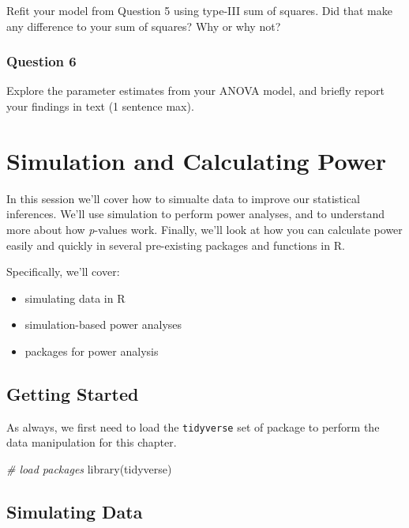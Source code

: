 \documentclass[
]{book}
\newenvironment{Shaded}{\begin{snugshade}}{\end{snugshade}}
\newcommand{\CommentTok}[1]{\textcolor[rgb]{0.56,0.35,0.01}{\textit{#1}}}
\newcommand{\FunctionTok}[1]{\textcolor[rgb]{0.00,0.00,0.00}{#1}}
\newcommand{\NormalTok}[1]{#1}
\providecommand{\tightlist}{%
  \setlength{\itemsep}{0pt}\setlength{\parskip}{0pt}}
\begin{document}
Refit your model from Question 5 using type-III sum of squares. Did that make any difference to your sum of squares? Why or why not?

\hypertarget{question-6-6}{%
\subsection{Question 6}\label{question-6-6}}

Explore the parameter estimates from your ANOVA model, and briefly report your findings in text (1 sentence max).

\hypertarget{simulation-and-calculating-power}{%
\chapter{Simulation and Calculating Power}\label{simulation-and-calculating-power}}

In this session we'll cover how to simualte data to improve our statistical inferences. We'll use simulation to perform power analyses, and to understand more about how \emph{p}-values work. Finally, we'll look at how you can calculate power easily and quickly in several pre-existing packages and functions in R.

Specifically, we'll cover:

\begin{itemize}
\tightlist
\item
  simulating data in R
\item
  simulation-based power analyses
\item
  packages for power analysis
\end{itemize}

\hypertarget{getting-started-5}{%
\section{Getting Started}\label{getting-started-5}}

As always, we first need to load the \texttt{tidyverse} set of package to perform the data manipulation for this chapter.

\begin{Shaded}
\begin{Highlighting}[]
\CommentTok{\# load packages}
\FunctionTok{library}\NormalTok{(tidyverse)}
\end{Highlighting}
\end{Shaded}

\hypertarget{simulating-data}{%
\section{Simulating Data}\label{simulating-data}}
\end{document}

